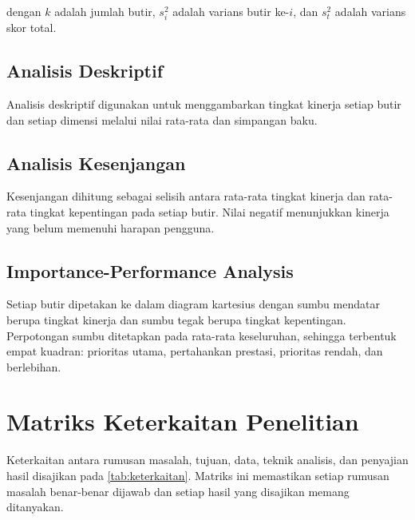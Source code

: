 \noindent dengan $k$ adalah jumlah butir, $s_{i}^{2}$ adalah varians butir
ke-$i$, dan $s_{t}^{2}$ adalah varians skor total.

\subsection{Analisis Deskriptif}
Analisis deskriptif digunakan untuk menggambarkan tingkat kinerja setiap butir
dan setiap dimensi melalui nilai rata-rata dan simpangan baku.

\subsection{Analisis Kesenjangan}
Kesenjangan dihitung sebagai selisih antara rata-rata tingkat kinerja dan
rata-rata tingkat kepentingan pada setiap butir. Nilai negatif menunjukkan
kinerja yang belum memenuhi harapan pengguna.

\subsection{Importance-Performance Analysis}
Setiap butir dipetakan ke dalam diagram kartesius dengan sumbu mendatar berupa
tingkat kinerja dan sumbu tegak berupa tingkat kepentingan. Perpotongan sumbu
ditetapkan pada rata-rata keseluruhan, sehingga terbentuk empat kuadran:
prioritas utama, pertahankan prestasi, prioritas rendah, dan berlebihan.

\section{Matriks Keterkaitan Penelitian}


Keterkaitan antara rumusan masalah, tujuan, data, teknik analisis, dan penyajian
hasil disajikan pada \cref{tab:keterkaitan}. Matriks ini memastikan setiap
rumusan masalah benar-benar dijawab dan setiap hasil yang disajikan memang
ditanyakan.

